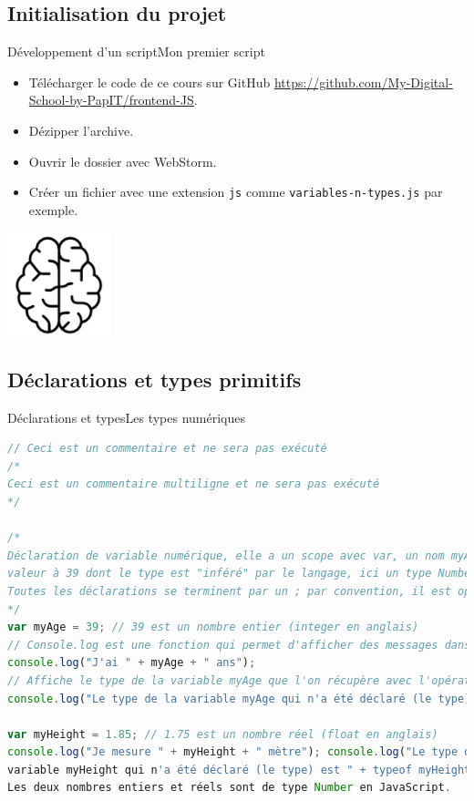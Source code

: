 \documentclass{beamer}
\begin{document}
\subsection{Initialisation du projet}\label{subsec:projectinit}

\begin{frame}{Développement d'un script}{Mon premier script}
    \begin{itemize}
        \item Télécharger le code de ce cours sur GitHub
              \url{https://github.com/My-Digital-School-by-PapIT/frontend-JS}.
        \item Dézipper l'archive.
        \item Ouvrir le dossier avec WebStorm.
        \item Créer un fichier avec une extension
              \lstinline{js} comme \lstinline{variables-n-types.js} par exemple.
    \end{itemize}
    \bigbreak
    \centering
    \includegraphics[width=3cm]{image/intelligence}
\end{frame}

\subsection{Déclarations et types primitifs}\label{subsec:declare-n-types}

\begin{frame}[fragile]{Déclarations et types}{Les types numériques}
    \begin{lstlisting}[language=JavaScript,title={\scriptsize{Script JavaScript}},basicstyle=\tiny\ttfamily]
// Ceci est un commentaire et ne sera pas exécuté
/*
Ceci est un commentaire multiligne et ne sera pas exécuté
*/

/*
Déclaration de variable numérique, elle a un scope avec var, un nom myAge et une
valeur à 39 dont le type est "inféré" par le langage, ici un type Number.
Toutes les déclarations se terminent par un ; par convention, il est optionnel.
*/
var myAge = 39; // 39 est un nombre entier (integer en anglais)
// Console.log est une fonction qui permet d'afficher des messages dans la console
console.log("J'ai " + myAge + " ans");
// Affiche le type de la variable myAge que l'on récupère avec l'opérateur typeof
console.log("Le type de la variable myAge qui n'a été déclaré (le type) est " + typeof myAge);

var myHeight = 1.85; // 1.75 est un nombre réel (float en anglais)
console.log("Je mesure " + myHeight + " mètre"); console.log("Le type de la
variable myHeight qui n'a été déclaré (le type) est " + typeof myHeight); //
Les deux nombres entiers et réels sont de type Number en JavaScript.
    \end{lstlisting}
\end{frame}
\end{document}
